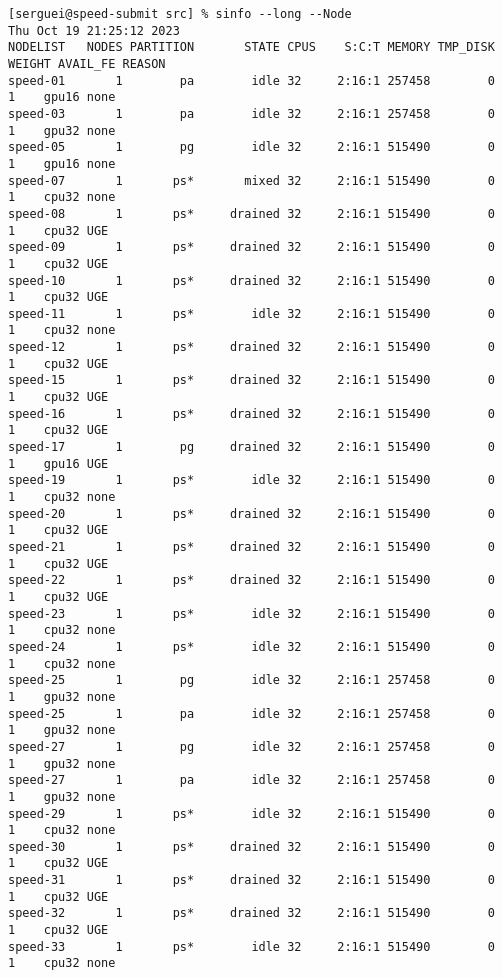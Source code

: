 \scriptsize
\begin{verbatim}
[serguei@speed-submit src] % sinfo --long --Node
Thu Oct 19 21:25:12 2023
NODELIST   NODES PARTITION       STATE CPUS    S:C:T MEMORY TMP_DISK WEIGHT AVAIL_FE REASON
speed-01       1        pa        idle 32     2:16:1 257458        0      1    gpu16 none
speed-03       1        pa        idle 32     2:16:1 257458        0      1    gpu32 none
speed-05       1        pg        idle 32     2:16:1 515490        0      1    gpu16 none
speed-07       1       ps*       mixed 32     2:16:1 515490        0      1    cpu32 none
speed-08       1       ps*     drained 32     2:16:1 515490        0      1    cpu32 UGE
speed-09       1       ps*     drained 32     2:16:1 515490        0      1    cpu32 UGE
speed-10       1       ps*     drained 32     2:16:1 515490        0      1    cpu32 UGE
speed-11       1       ps*        idle 32     2:16:1 515490        0      1    cpu32 none
speed-12       1       ps*     drained 32     2:16:1 515490        0      1    cpu32 UGE
speed-15       1       ps*     drained 32     2:16:1 515490        0      1    cpu32 UGE
speed-16       1       ps*     drained 32     2:16:1 515490        0      1    cpu32 UGE
speed-17       1        pg     drained 32     2:16:1 515490        0      1    gpu16 UGE
speed-19       1       ps*        idle 32     2:16:1 515490        0      1    cpu32 none
speed-20       1       ps*     drained 32     2:16:1 515490        0      1    cpu32 UGE
speed-21       1       ps*     drained 32     2:16:1 515490        0      1    cpu32 UGE
speed-22       1       ps*     drained 32     2:16:1 515490        0      1    cpu32 UGE
speed-23       1       ps*        idle 32     2:16:1 515490        0      1    cpu32 none
speed-24       1       ps*        idle 32     2:16:1 515490        0      1    cpu32 none
speed-25       1        pg        idle 32     2:16:1 257458        0      1    gpu32 none
speed-25       1        pa        idle 32     2:16:1 257458        0      1    gpu32 none
speed-27       1        pg        idle 32     2:16:1 257458        0      1    gpu32 none
speed-27       1        pa        idle 32     2:16:1 257458        0      1    gpu32 none
speed-29       1       ps*        idle 32     2:16:1 515490        0      1    cpu32 none
speed-30       1       ps*     drained 32     2:16:1 515490        0      1    cpu32 UGE
speed-31       1       ps*     drained 32     2:16:1 515490        0      1    cpu32 UGE
speed-32       1       ps*     drained 32     2:16:1 515490        0      1    cpu32 UGE
speed-33       1       ps*        idle 32     2:16:1 515490        0      1    cpu32 none

\end{verbatim}
